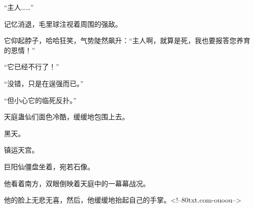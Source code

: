 \begin{this_body}
“主人……”

记忆消退，毛里球注视着周围的强敌。

它仰起脖子，哈哈狂笑，气势陡然飙升：“主人啊，就算是死，我也要报答您养育的恩情！”

“它已经不行了！”

“没错，只是在逞强而已。”

“但小心它的临死反扑。”

天庭蛊仙们面色冷酷，缓缓地包围上去。

黑天。

镇运天宫。

巨阳仙僵盘坐着，宛若石像。

他看着南方，双眼倒映着天庭中的一幕幕战况。

他的脸上无悲无喜，然后，他缓缓地抬起自己的手掌。<!--80txt.com-ouoou-->

\end{this_body}

